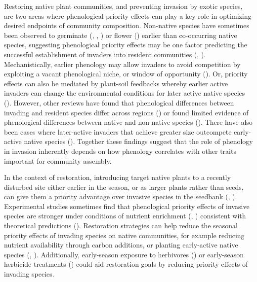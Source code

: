 \documentclass[11pt]{article}
\begin{document}
Restoring native plant communities, and preventing invasion by exotic species, are two areas where phenological priority effects can play a key role in optimizing desired endpoints of community composition. Non-native species have sometimes been observed to germinate (\citet{wainwright2012seasonal}, \citet{wilsey2011biodiversity}, \citet{marushia2010phenology}) or flower (\citet{cleland2013strengthening}) earlier than co-occurring native species, suggesting phenological priority effects may be one factor predicting the successful establishment of invaders into resident communities (\citet{wolkovich2011phenology}, \citet{alexander2019earlier}). Mechanistically, earlier phenology may allow invaders to avoid competition by exploiting a vacant phenological niche, or window of opportunity (\citet{gioria2014resource}). Or, priority effects can also be mediated by plant-soil feedbacks whereby earlier active invaders can change the environmental conditions for later active native species (\citet{grman2010within}). However, other reviews have found that phenological differences between invading and resident species differ across regions (\citet{godoy2009flowering}) or found limited evidence of phenological differences between native and non-native species (\citet{zettlemoyer2022limited}). There have also been cases where later-active invaders that achieve greater size outcompete early-active native species (\citet{godoy2014}). Together these findings suggest that the role of phenology in invasion inherently depends on how phenology correlates with other traits important for community assembly.

In the context of restoration, introducing target native plants to a recently disturbed site either earlier in the season, or as larger plants rather than seeds, can give them a priority advantage over invasive species in the seedbank (\citet{young2017using}, \citet{wilsey2021restoration}). Experimental studies sometimes find that phenological priority effects of invasive species are stronger under conditions of nutrient enrichment (\citet{kardol2013resource}, \citet{valliere2022phenological})  consistent with theoretical predictions (\citet{vannette2014historical}).  Restoration strategies can help reduce the seasonal priority effects of invading species on native communities, for example reducing nutrient availability through carbon additions, or planting early-active native species (\citet{cleland2013strengthening}, \citet{hess2019priority}). Additionally, early-season exposure to herbivores (\citet{waterton2016trade}) or early-season herbicide treatments (\cite{marushia2010phenology}) could aid restoration goals by reducing priority effects of invading species.
\end{document}
